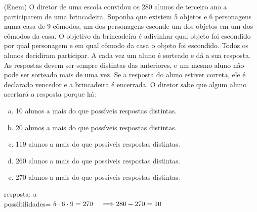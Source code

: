 \begin{ex}
(Enem) O diretor de uma escola convidou os 280 alunos de terceiro ano a participarem de uma brincadeira. Suponha que existem 5 objetos e 6 personagens numa casa de 9 cômodos; um dos personagens esconde um dos objetos em um dos cômodos da casa. O objetivo da brincadeira é adivinhar qual objeto foi escondido por qual personagem e em qual cômodo da casa o objeto foi escondido. Todos os alunos decidiram participar. A cada vez um aluno é sorteado e dá a sua resposta. As respostas devem ser sempre distintas das anteriores, e um mesmo aluno não pode ser sorteado mais de uma vez. Se a resposta do aluno estiver correta, ele é declarado vencedor e a brincadeira é encerrada. O diretor sabe que algum aluno acertará a resposta porque há:
   \begin{enumerate}[(a)]
   \item 10 alunos a mais do que possíveis respostas distintas.
   \item 20 alunos a mais do que possíveis respostas distintas.
   \item 119 alunos a mais do que possíveis respostas distintas. 
   \item 260 alunos a mais do que possíveis respostas distintas. 
   \item 270 alunos a mais do que possíveis respostas distintas. 
   \end{enumerate}
     \begin{sol}
      resposta: a \\
      possibilidades= $5\cdot6\cdot9= 270 \hspace{0,4cm} \Longrightarrow 280 - 270=10$
     \end{sol}
\end{ex}